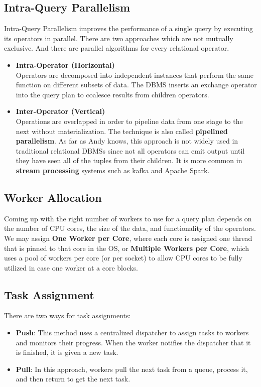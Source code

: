 \documentclass[11pt]{article}
\begin{document}
\subsection*{Intra-Query Parallelism}
Intra-Query Parallelism improves the performance of a single query by executing its operators in parallel. There are two approaches which are not mutually exclusive. And there are parallel algorithms for every relational operator.
\begin{itemize}
    \item \textbf{Intra-Operator (Horizontal)}\\
    Operators are decomposed into independent instances that perform the same function on different subsets of data. The DBMS inserts an exchange operator into the query plan to coalesce results from children operators.
    \item \textbf{Inter-Operator (Vertical)}\\
    Operations are overlapped in order to pipeline data from one stage to the next without materialization. The technique is also called \textbf{pipelined parallelism}. As far as Andy knows, this approach is not widely used in traditional relational DBMSs since not all operators can emit output until they have seen all of the tuples from their children. It is more common in \textbf{stream processing} systems such as kafka and Apache Spark.
\end{itemize}

\subsection*{Worker Allocation}
Coming up with the right number of workers to use for a query plan depends on the number of CPU cores, the size of the data, and functionality of the operators. We may assign \textbf{One Worker per Core}, where each core is assigned one thread that is pinned to that core in the OS, or \textbf{Multiple Workers per Core}, which uses a pool of workers per core (or per socket) to allow CPU cores to be fully utilized in case one worker at a core blocks.

\subsection*{Task Assignment}
There are two ways for task assignments:
\begin{itemize}
    \item \textbf{Push}: This method uses a centralized dispatcher to assign tasks to workers and monitors their progress. When the worker notifies the dispatcher that it is finished, it is given a new task.
    \item \textbf{Pull}: In this approach, workers pull the next task from a queue, process it, and then return to get the next task.
\end{itemize}

\newpage


\end{document}
